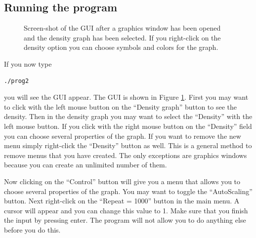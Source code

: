 \documentclass[12pt,letterpaper]{article}
\begin{document}
\subsection{Running the program}

\begin{figure}
\begin{center}
\end{center}
\caption{Screen-shot of the GUI after a graphics window has been opened
and the density graph has been selected. If you right-click on the
density option you can choose symbols and colors for the graph.}
\label{fig1}
\end{figure}

If you now type 
\begin{verbatim}
./prog2
\end{verbatim}
you will see the GUI appear. The GUI is shown in Figure
\ref{fig1}. First you may want to click with the left mouse button on
the ``Density graph'' button to see the density. Then in the density
graph you may want to select the ``Density'' with the left mouse
button. If you click with the right mouse button on the ``Density''
field you can choose several properties of the graph. If you want to
remove the new menu simply right-click the ``Density'' button as
well. This is a general method to remove menus that you have
created. The only exceptions are graphics windows because you can
create an unlimited number of them.

Now clicking on the ``Control'' button will give you a menu that
allows you to choose several properties of the graph. You may want to
toggle the ``AutoScaling'' button. Next right-click on the ``Repeat = 1000''
button in the main menu. A cursor will appear and you can change this
value to 1. Make sure that you finish the input by pressing enter. The
program will not allow you to do anything else before you do this.
\end{document}
